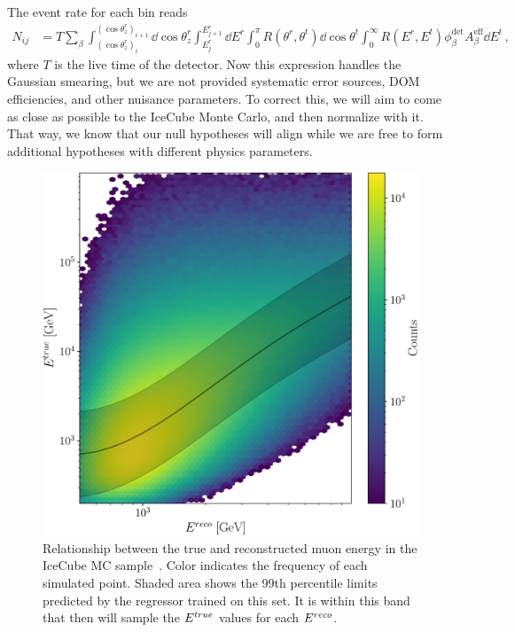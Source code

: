 The event rate for each bin reads
\begin{align}\label{eq:ICevents}
    N_{ij} &= T \sum_\beta\int_{(\cos{\theta_z^r})_i}^{(\cos{\theta_z^r})_{i+1}} \dd \cos{\theta^r_z} \int_{E^r_{j}}^{E^r_{j+1}} \dd E^r 
    \int_0^\pi R(\theta^r,\theta^t) \dd \cos{\theta^t} \int_0^\infty R(E^r,E^t) \phi_\beta^\text{det}  A^\text{eff}_\beta \dd E^t
    \,,
\end{align}
where $T$ is the live time of the detector. Now this expression handles the Gaussian smearing, but we are not provided systematic error sources, DOM efficiencies, and other nuisance parameters. To correct this,
we will aim to come as close as possible to the IceCube Monte Carlo, and then normalize with it. That way, we know that our null hypotheses will align while we are free to form additional hypotheses with different 
physics parameters. %


\begin{figure}[ht]
    \begin{center}
       \includegraphics[width=0.7\linewidth]{figures/IC_MC_gpr.pdf}
    \end{center}
    \caption{Relationship between the true and reconstructed muon energy in the IceCube MC sample~\cite{IC2016}.
    Color indicates the frequency of each simulated point.
    Shaded area shows the 99th percentile limits predicted by the regressor trained on this set. It is within this band 
    that then will sample the $E^{true}$ values for each $E^{reco}$.}\label{fig:IC_MC_gpr}
 \end{figure}

